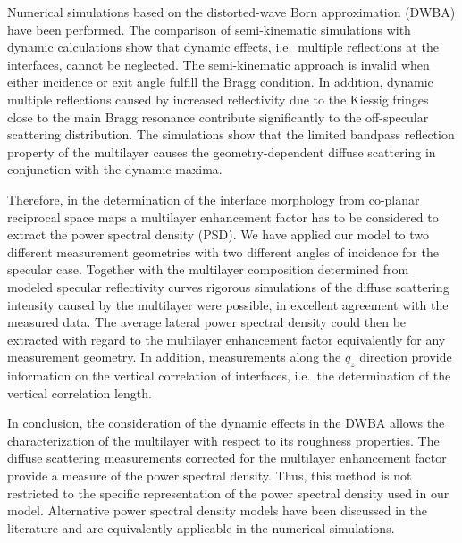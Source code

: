 Numerical simulations based on the distorted-wave Born approximation (DWBA) have been performed. The comparison of semi-kinematic simulations with dynamic calculations show that dynamic effects, i.e.~multiple reflections at the interfaces, cannot be neglected. The semi-kinematic approach is invalid when either incidence or exit angle fulfill the Bragg condition. In addition, dynamic multiple reflections caused by increased reflectivity due to the Kiessig fringes close to the main Bragg resonance contribute significantly to the off-specular scattering distribution. The simulations show that the limited bandpass reflection property of the multilayer causes the geometry-dependent diffuse scattering in conjunction with the dynamic maxima.

Therefore, in the determination of the interface morphology from co-planar reciprocal space maps a multilayer enhancement factor has to be considered to extract the power spectral density (PSD). We have applied our model to two different measurement geometries with two different angles of incidence for the specular case. Together with the multilayer composition determined from modeled specular reflectivity curves rigorous simulations of the diffuse scattering intensity caused by the multilayer were possible, in excellent agreement with the measured data. The average lateral power spectral density could then be extracted with regard to the multilayer enhancement factor equivalently for any measurement geometry. In addition, measurements along the $q_z$ direction provide information on the vertical correlation of interfaces, i.e.~the determination of the vertical correlation length. 

In conclusion, the consideration of the dynamic effects in the DWBA allows the characterization of the multilayer with respect to its roughness properties. The diffuse scattering measurements corrected for the multilayer enhancement factor provide a measure of the power spectral density. Thus, this method is not restricted to the specific representation of the power spectral density used in our model. Alternative power spectral density models have been discussed in the literature \cite{PhysRevB.38.2297, PhysRevB.48.2873} and are equivalently applicable in the numerical simulations.
